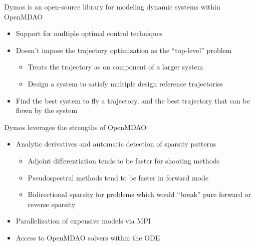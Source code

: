 \documentclass[aspectratio=169, usenames,dvipsnames, 14pt]{beamer}
\begin{document}
\begin{frame}{Dymos is an open-source library for modeling dynamic systems within OpenMDAO}
    \begin{itemize}
        \item Support for multiple optimal control techniques
        \vspace{0.25cm}
        \item Doesn't impose the trajectory optimization as the ``top-level'' problem
        \vspace{0.25cm}
        	\begin{itemize}
        	  \item Treats the trajectory as on component of a larger system
    		  \vspace{0.25cm}
		      \item Design a system to satisfy multiple design reference trajectories
		    \end{itemize}
        \vspace{0.25cm}
		\item Find the best system to fly a trajectory, and the best trajectory that can be flown by the system
    \end{itemize}
\end{frame}


\begin{frame}{Dymos leverages the strengths of OpenMDAO}
    \begin{itemize}
        \item Analytic derivatives and automatic detection of sparsity patterns
        \vspace{0.25cm}
        	\begin{itemize}
        	  \item Adjoint differentiation tends to be faster for shooting methods
              \vspace{0.25cm}
        	  \item Pseudospectral methods tend to be faster in forward mode
              \vspace{0.25cm}
	  		  \item Bidirectional sparsity for problems which would ``break'' pure forward or reverse sparsity
	        \end{itemize}
        \vspace{0.25cm}
		\item Parallelization of expensive models via MPI
        \vspace{0.25cm}
        \item Access to OpenMDAO solvers within the ODE
    \end{itemize}
\end{frame}
\end{document}
